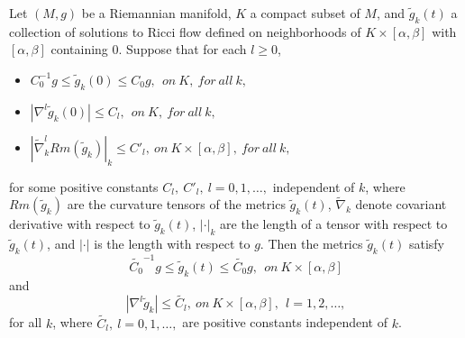 \begin{lemma}
  \label{lem:cz-time-uniform-smooth-convergence-from-one-time-slice}
Let $(M,g)$ be a Riemannian manifold, $K$ a compact subset of $M$,
and $\tilde{g}_k(t)$ a collection of solutions to Ricci flow
defined on neighborhoods of $K\times[\alpha,\beta]$ with
$[\alpha,\beta]$ containing $0$.  Suppose that for each $l\geq0$,
\begin{itemize}
\item[(a)] $C_0^{-1}g\leq\tilde{g}_k(0)\leq C_0g,\ \ on\ K,\ for\
all\ k,$ \item[(b)] $|\nabla^l\tilde{g}_k(0)|\leq C_l,\ \ on\ K,\
for\ all\ k,$ \item[(c)]
$|\tilde{\nabla}^l_kRm(\tilde{g}_k)|_k\leq C'_l,\ on\
K\times[\alpha,\beta],\ for\ all\ k,$
\end{itemize}
for some positive constants $C_l,\ C'_l,\ l=0,1,\ldots,$
independent of $k$, where $Rm(\tilde{g}_k)$ are the curvature
tensors of the metrics $\tilde{g}_k(t)$, $\tilde{\nabla}_k$ denote
covariant derivative with respect to $\tilde{g}_k(t)$, $|\cdot|_k$
are the length of a tensor with respect to $\tilde{g}_k(t)$, and
$|\cdot|$ is the length with respect to $g$. Then the metrics
$\tilde{g}_k(t)$ satisfy
$$
\tilde{C_0}^{-1}g\leq\tilde{g}_k(t) \leq \tilde{C_0}g,\ \ on\
K\times[\alpha,\beta]
$$
and
$$
|\nabla^l\tilde{g}_k|\leq\tilde{C_l},\ on\ K\times[\alpha,\beta],\
\ l=1,2,\ldots,
$$
for all $k$, where $\tilde{C_l},\ l=0,1,\ldots,$ are positive
constants independent of $k$.
\end{lemma}
